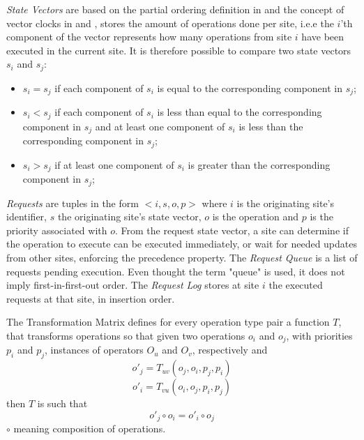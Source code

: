 \textit{State Vectors} are based on the partial ordering definition in \cite{Lamport1978} and the concept of vector clocks in \cite{Liskov1986} and \cite{Fidge1988}, stores the amount of operations done per site, i.e.e the $i$'th component of the vector represents how many operations from site $i$ have been executed in the current site. It is therefore possible to compare two state vectors $s_i$ and $s_j$:
\begin{itemize}
    \item $s_i = s_j$ if each component of $s_i$ is equal to the corresponding component in $s_j$;
    \item $s_i < s_j$ if each component of $s_i$ is less than equal to the corresponding component in $s_j$ and at least one component of $s_i$ is less than the corresponding component in $s_j$;
    \item $s_i > s_j$ if at least one component of $s_i$ is greater than the corresponding component in $s_j$;
\end{itemize}

\textit{Requests} are tuples in the form $<i,s,o,p>$ where $i$ is the originating site's identifier, $s$ the originating site's state vector, $o$ is the operation and $p$ is the priority associated with $o$.
From the request state vector, a site can determine if the operation to execute can be executed immediately, or wait for needed updates from other sites, enforcing the precedence property. The \textit{Request Queue} is a list of requests pending execution. Even thought the term "queue" is used, it does not imply first-in-first-out order. The \textit{Request Log} stores at site $i$ the executed requests at that site, in insertion order.

The Transformation Matrix defines for every operation type pair a function $T$, that transforms operations so that given two operations $o_i$ and $o_j$, with priorities $p_i$ and $p_j$, instances of operators $O_u$ and $O_v$, respectively and
\begin{equation*}
    o'_j = T_{uv}(o_j, o_i, p_j, p_i)
\end{equation*}
\begin{equation*}
    o'_i = T_{vu}(o_i, o_j, p_i, p_j)
\end{equation*}
then $T$ is such that
\begin{equation*}
    o'_j \circ o_i = o'_i \circ o_j
\end{equation*}
$\circ$ meaning composition of operations.

